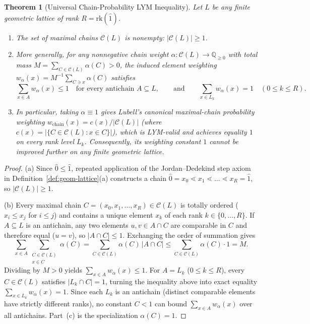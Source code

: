 \documentclass[11pt]{article}
\newtheorem{theorem}{Theorem}[section]
\theoremstyle{definition}
\theoremstyle{remark}
\newcommand{\rk}{\mathrm{rk}}
\begin{document}
\begin{theorem}[Universal Chain-Probability LYM Inequality]\label{thm:lubell}
Let $L$ be any finite geometric lattice of rank $R = \rk(\hat{1})$.
\begin{enumerate}
\item[(a)] The set of maximal chains $\mathcal{C}(L)$ is nonempty: $|\mathcal{C}(L)| \ge 1$.
\item[(b)] More generally, for \emph{any} nonnegative chain weight $\alpha : \mathcal{C}(L) \to \mathbb{Q}_{\ge 0}$ with total mass $M = \sum_{C \in \mathcal{C}(L)} \alpha(C) > 0$, the induced element weighting $w_\alpha(x) = M^{-1} \sum_{C \ni x} \alpha(C)$ satisfies
\begin{equation}\label{eq:convex-chain-lym}
  \sum_{x \in A} w_\alpha(x) \le 1 \quad\text{for every antichain } A \subseteq L, \qquad\text{and}\qquad
  \sum_{x \in L_k} w_\alpha(x) = 1 \quad (0 \le k \le R).
\end{equation}
\item[(c)] In particular, taking $\alpha \equiv 1$ gives Lubell's canonical maximal-chain probability weighting $w_{\mathrm{chain}}(x) = c(x)/|\mathcal{C}(L)|$ (where $c(x) = |\{C \in \mathcal{C}(L) : x \in C\}|$), which is LYM-valid and achieves equality $1$ on every rank level $L_k$. Consequently, its weighting constant $1$ cannot be improved further on any finite geometric lattice.
\end{enumerate}
\end{theorem}
\begin{proof}
(a) Since $\hat{0} \le \hat{1}$, repeated application of the Jordan--Dedekind step axiom in Definition~\ref{def:geom-lattice}(a) constructs a chain $\hat{0} = x_0 \lessdot x_1 \lessdot \dots \lessdot x_R = \hat{1}$, so $|\mathcal{C}(L)| \ge 1$.

(b) Every maximal chain $C = (x_0, x_1, \dots, x_R) \in \mathcal{C}(L)$ is totally ordered ($x_i \le x_j$ for $i \le j$) and contains a unique element $x_k$ of each rank $k \in \{0,\dots,R\}$. If $A \subseteq L$ is an antichain, any two elements $u, v \in A \cap C$ are comparable in $C$ and therefore equal ($u = v$), so $|A \cap C| \le 1$. Exchanging the order of summation gives
\[
  \sum_{x \in A} \sum_{\substack{C \in \mathcal{C}(L) \\ x \in C}} \alpha(C)
  = \sum_{C \in \mathcal{C}(L)} \alpha(C) \, |A \cap C|
  \le \sum_{C \in \mathcal{C}(L)} \alpha(C) \cdot 1 = M.
\]
Dividing by $M > 0$ yields $\sum_{x \in A} w_\alpha(x) \le 1$. For $A = L_k$ ($0 \le k \le R$), every $C \in \mathcal{C}(L)$ satisfies $|L_k \cap C| = 1$, turning the inequality above into exact equality $\sum_{x \in L_k} w_\alpha(x) = 1$. Since each $L_k$ is an antichain (distinct comparable elements have strictly different ranks), no constant $C < 1$ can bound $\sum_{x \in A} w_\alpha(x)$ over all antichains. Part~(c) is the specialization $\alpha(C) = 1$.
\end{proof}
\end{document}
